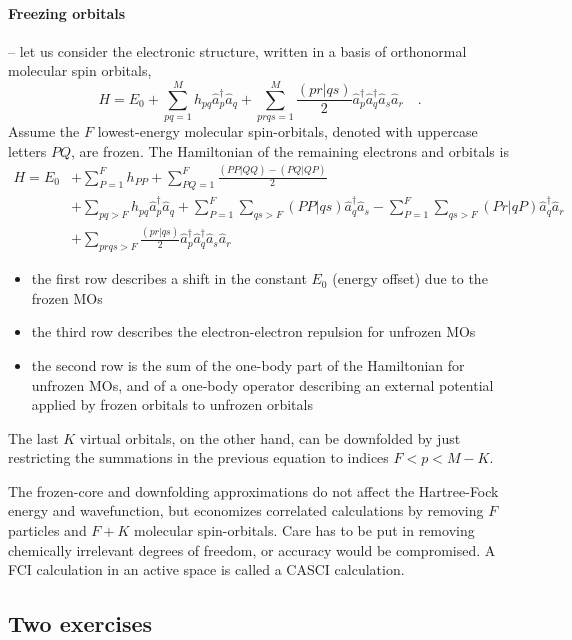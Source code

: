 \documentclass{article}
\newcommand{\CRE}[1]{\hat{a}^\dagger_{#1}}
\newcommand{\DIS}[1]{\hat{a}^{\phantom{\dagger}}_{#1}}
\begin{document}
\paragraph{Freezing orbitals} -- let us consider the electronic structure, written in a basis of orthonormal molecular spin orbitals,
\begin{equation}
H = E_0 + \sum_{pq=1}^M h_{pq} \CRE{p} \DIS{q} + \sum_{prqs=1}^M \frac{(pr|qs)}{2} \CRE{p} \CRE{q} \DIS{s} \DIS{r} \quad .
\end{equation}
Assume the $F$ lowest-energy molecular spin-orbitals, denoted with uppercase letters $PQ$, are frozen. The Hamiltonian of the remaining electrons and orbitals is
\begin{equation}
\begin{split}
H = E_0 &+ \sum_{P=1}^F h_{PP} + \sum_{PQ=1}^F \frac{(PP|QQ)-(PQ|QP)}{2} \\
&+ \sum_{pq>F} h_{pq} \CRE{p} \DIS{q} +
\sum_{P=1}^F \sum_{qs>F} (PP|qs) \CRE{q} \DIS{s}
-
\sum_{P=1}^F \sum_{qs>F} (Pr|qP) \CRE{q} \DIS{r}
\\
&+ 
\sum_{prqs>F} \frac{(pr|qs)}{2} \CRE{p} \CRE{q} \DIS{s} \DIS{r} 
\end{split}
\end{equation}
\begin{itemize}
\item the first row describes a shift in the constant $E_0$ (energy offset) due to the frozen MOs
\item the third row describes the electron-electron repulsion for unfrozen MOs
\item the second row is the sum of the one-body part of the Hamiltonian for unfrozen MOs, and of a one-body operator
describing an external potential applied by frozen orbitals to unfrozen orbitals
\end{itemize}
The last $K$ virtual orbitals, on the other hand, can be downfolded by just restricting the summations in the previous equation to indices $F < p < M-K$.

The frozen-core and downfolding approximations do not affect the Hartree-Fock energy and wavefunction, but economizes correlated calculations by removing $F$ particles and $F+K$ molecular spin-orbitals.
Care has to be put in removing chemically irrelevant degrees of freedom, or accuracy would be compromised.
A FCI calculation in an active space is called a CASCI calculation.


\subsection{Two exercises}
\end{document}

